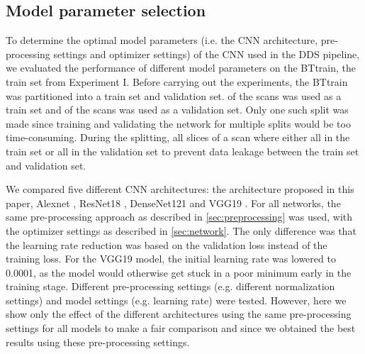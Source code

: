 \clearpage
\begin{subappendices}
\section{Model parameter selection}
\label{app:crossval}

To determine the optimal model parameters (i.e. the \gls{CNN} architecture, pre-processing settings and optimizer settings) of the \gls{CNN} used in the \gls{DDS} pipeline, we evaluated the performance of different model parameters on the \gls{BTtrain}, the train set from Experiment I.
Before carrying out the experiments, the \gls{BTtrain} was partitioned into a train set and validation set.
 of the \glspl{scan} was used as a train set and  of the \glspl{scan} was used as a validation set.
Only one such split was made since training and validating the network for multiple splits would be too time-consuming.
During the splitting, all \glspl{slice} of a \gls{scan} where either all in the train set or all in the validation set to prevent data leakage between the train set and validation set.

We compared five different \gls{CNN} architectures: the architecture proposed in this paper, Alexnet \autocite{krizhevsky2012imagenet}, ResNet18 \autocite{he2016deep}, DenseNet121 \autocite{huang2017densely} and VGG19 \autocite{simonyan2014very}.
For all networks, the same pre-processing approach as described in \cref{sec:preprocessing} was used, with the optimizer settings as described in \cref{sec:network}.
The only difference was that the learning rate reduction was based on the validation loss instead of the training loss.
For the VGG19 model, the initial learning rate was lowered to \num{0.0001}, as the model would otherwise get stuck in a poor minimum early in the training stage.
Different pre-processing settings (e.g. different normalization settings) and model settings (e.g. learning rate) were tested.
However, here we show only the effect of the different architectures using the same pre-processing settings for all models to make a fair comparison and since we obtained the best results using these pre-processing settings.


\end{subappendices}
